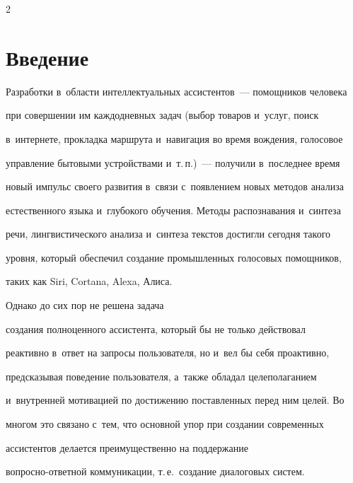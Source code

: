 \begin{multicols}{2}





\label{st\stat}


  


\section{Введение}





  Разработки в~области интеллектуальных ас\-сис\-тен\-тов~--- помощников человека 


при совершении им каждодневных задач (выбор товаров и~услуг, поиск 


в~интернете, прокладка маршрута и~навигация во время вождения, голосовое 


управление бытовыми устройствами и~т.\,п.)~--- получили в~последнее время 


новый импульс своего развития в~связи с~появлением новых методов анализа 


естественного языка и~глубокого обучения. Методы распознавания и~синтеза 


речи, лингвистического анализа и~синтеза текстов достигли сегодня такого 


уровня, который обеспечил создание промышленных голосовых помощников, 


таких как Siri, Cortana, Alexa, Алиса. 


%


Однако до сих пор не решена задача 


создания полноценного ассистента, который бы не только действовал 


реактивно в~ответ на запросы пользователя, но и~вел бы себя проактивно, 


предсказывая поведение пользователя, а~также обладал целеполаганием 


и~внутренней мотивацией по достижению поставленных перед ним целей. Во


многом это связано с~тем, что основной упор при создании современных 


ассистентов делается преимущественно на поддержание  


воп\-рос\-но-от\-вет\-ной коммуникации, т.\,е.\ создание диалоговых \mbox{систем}. 


  



\end{multicols}
